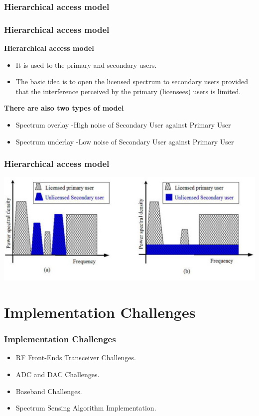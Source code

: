 \documentclass{beamer}
\begin{document}
\subsubsection{Hierarchical access model}
\begin{frame}
\frametitle{Hierarchical access model}
\textbf{Hierarchical access model}
\begin{itemize}
\item It is used to the primary and secondary users. 
\item The basic idea is to open the licensed spectrum to secondary users provided that the interference perceived by the primary (licensees) users is limited.
\end{itemize}

\textbf{There are also two types of model}
\begin{itemize}
\item Spectrum overlay
        -High noise of Secondary User against Primary User
\item Spectrum underlay
		-Low noise of Secondary User against Primary User
\end{itemize}

\end{frame}

\begin{frame}
\frametitle{ Hierarchical access model}

\includegraphics[scale=0.5]{hiera}

\end{frame}

\section{Implementation Challenges}
\begin{frame}
\frametitle{Implementation Challenges}
\begin{itemize}
\item RF Front-Ends Transceiver Challenges.
\item ADC and DAC Challenges.
\item Baseband Challenges.
\item Spectrum Sensing Algorithm Implementation.
\end{itemize}
\end{frame}
\end{document}
